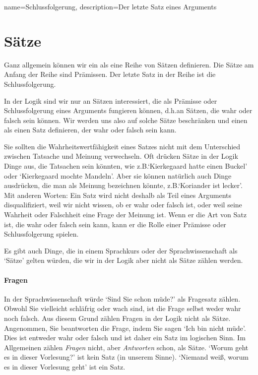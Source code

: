 {
name=Schlussfolgerung,
description={Der letzte Satz eines \gls{Argument}s}
}


\section{Sätze}
\label{intro.sentences}

Ganz allgemein können wir ein  als eine Reihe von Sätzen definieren. Die Sätze am Anfang der Reihe sind Prämissen. Der letzte Satz in der Reihe ist die Schlussfolgerung.

In der Logik sind wir nur an Sätzen interessiert, die als Prämisse oder Schlussfolgerung eines Arguments fungieren können, d.h.\@ an Sätzen, die wahr oder falsch sein können.  Wir werden uns also auf solche Sätze beschränken und einen  als einen Satz definieren, der wahr oder falsch sein kann.

Sie sollten die Wahrheitswertfähigkeit eines Satzes nicht mit dem Unterschied zwischen Tatsache und Meinung verwechseln. Oft drücken Sätze in der Logik Dinge aus, die Tatsachen sein könnten, wie z.B.\@ `Kierkegaard hatte einen Buckel' oder `Kierkegaard mochte Mandeln'. Aber sie können natürlich auch Dinge ausdrücken, die man als Meinung bezeichnen könnte, z.B.\@ `Koriander ist lecker'. Mit anderen Worten: Ein Satz wird nicht deshalb als Teil eines Arguments disqualifiziert, weil wir nicht wissen, ob er wahr oder falsch ist, oder weil seine Wahrheit oder Falschheit eine Frage der Meinung ist. Wenn er die Art von Satz ist, die wahr oder falsch sein kann, kann er die Rolle einer Prämisse oder Schlussfolgerung spielen.

Es gibt auch Dinge, die in einem Sprachkurs oder der Sprachwissenschaft als `Sätze' gelten würden, die wir in der Logik aber nicht als Sätze zählen werden.

\paragraph{Fragen} In der Sprachwissenschaft würde `Sind Sie schon müde?' als Fragesatz zählen. Obwohl Sie vielleicht schläfrig oder wach sind, ist die Frage selbst weder wahr noch falsch. Aus diesem Grund zählen Fragen in der Logik nicht als Sätze. Angenommen, Sie beantworten die Frage, indem Sie sagen `Ich bin nicht müde'. Dies ist entweder wahr oder falsch und ist daher ein Satz im logischen Sinn. Im Allgemeinen zählen \emph{Fragen} nicht, aber \emph{Antworten} schon, als Sätze. `Worum geht es in dieser Vorlesung?' ist kein Satz (in unserem Sinne). `Niemand wei{\ss}, worum es in dieser Vorlesung geht' ist ein Satz.

